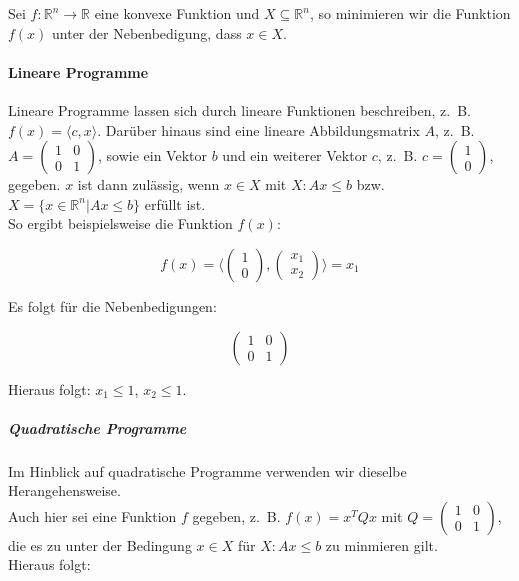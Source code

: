 \begin{Def}
Sei $f: \mathbb{R}^{n} \rightarrow \mathbb{R}$ eine konvexe Funktion und $X \subseteq \mathbb{R}^{n}$, so minimieren wir die Funktion $f(x)$ unter der Nebenbedigung, dass $x \in X$.
\end{Def}


\paragraph{Lineare Programme}

Lineare Programme lassen sich durch lineare Funktionen beschreiben, z.~B. $f(x) = \langle c, x \rangle$. Darüber hinaus sind eine lineare Abbildungsmatrix $A$, z.~B. $A = \begin{pmatrix}1 & 0 \\ 0 & 1 \end{pmatrix}$, sowie ein Vektor $b$ und ein weiterer Vektor $c$, z.~B. $c = \begin{pmatrix}1 \\ 0 \end{pmatrix}$, gegeben. $x$ ist dann zulässig, wenn $x \in X$ mit $X: Ax \le b$ bzw. $X = \{x \in \mathbb{R}^{n} | Ax \le b\}$ erfüllt ist. \\
So ergibt beispielsweise die Funktion $f(x)$:

\begin{equation*}
f(x) = \langle \begin{pmatrix}1 \\ 0 \end{pmatrix}, \begin{pmatrix}x_{1} \\ x_{2} \end{pmatrix} \rangle = x_{1}
\end{equation*}

Es folgt für die Nebenbedigungen:

\begin{equation*}
\begin{pmatrix}1 & 0 \\ 0 & 1 \end{pmatrix}
\end{equation*}

Hieraus folgt: $x_{1} \le 1$, $x_{2} \le 1$.

\subparagraph{Quadratische Programme}

Im Hinblick auf quadratische Programme verwenden wir dieselbe Herangehensweise. \\
Auch hier sei eine Funktion $f$ gegeben, z.~B. $f(x) = x^{T}Qx$ mit $Q = \begin{pmatrix}1 & 0 \\ 0 & 1 \end{pmatrix}$, die es zu unter der Bedingung $x \in X$ für $X: Ax \le b$ zu minmieren gilt.\\
Hieraus folgt:

